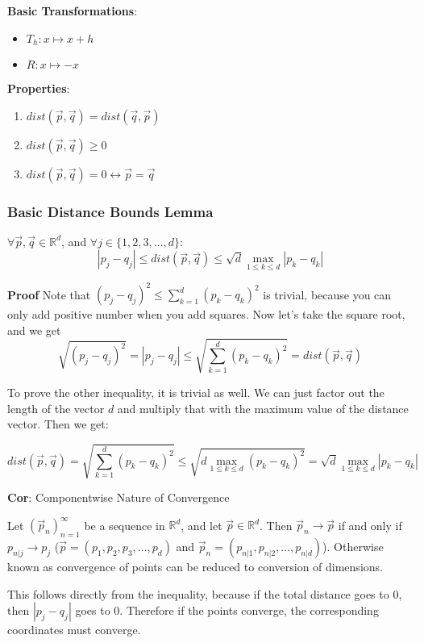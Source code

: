 \documentclass[11 pt, twoside]{article}
\begin{document}
\textbf{Basic Transformations}:
\begin{itemize}
    \item $T_h : x \mapsto x+h$
    \item $R: x \mapsto -x$
\end{itemize}

\textbf{Properties}:
\begin{enumerate}
    \item $dist(\vec{p}, \vec{q}) = dist(\vec{q}, \vec{p})$
    \item $dist(\vec{p}, \vec{q}) \geq 0$
    \item $dist(\vec{p}, \vec{q}) = 0 \leftrightarrow \vec{p} = \vec{q}$
\end{enumerate}

\subsubsection{Basic Distance Bounds Lemma}
 $\forall \vec{p}, \vec{q} \in
\mathbb{R}^d$, and $\forall j \in \{1,2,3,\dots,d\}$:
$$|p_j - q_j| \leq dist(\vec{p}, \vec{q}) \leq \sqrt{d} \max_{1 \leq k \leq
d} |p_k - q_k|$$

\textbf{Proof}
Note that $(p_j - q_j)^2 \leq \sum_{k = 1}^d (p_k - q_k)^2$ is trivial, because
you can only add positive number when you add squares. Now let's take the square
root, and we get
$$\sqrt{(p_j - q_j)^2} = |p_j - q_j| \leq \sqrt{\sum_{k = 1}^d (p_k - q_k)^2} =
dist(\vec{p}, \vec{q})$$

To prove the other inequality, it is trivial as well. We can just factor out the
length of the vector $d$ and multiply that with the maximum value of the
distance vector. Then we get:

$$dist(\vec{p}, \vec{q}) = \sqrt{\sum_{k = 1}^d (p_k - q_k)^2} \leq \sqrt{d \max_{1 \leq k \leq d} (p_k -
q_k)^2} = \sqrt{d} \max_{1 \leq k \leq
d} |p_k - q_k|$$

\textbf{Cor}: Componentwise Nature of Convergence

Let $(\vec{p}_n)_{n = 1}^\infty$ be a sequence in $\mathbb{R}^d$, and let
$\vec{p} \in \mathbb{R}^d$. Then $\vec{p}_n \to \vec{p}$ if and only if
$p_{n|j} \to p_j$ ($\vec{p} = (p_1, p_2, p_3, \dots, p_d)$ and $\vec{p}_n =
(p_{n|1}, p_{n|2}, \dots, p_{n|d})$). Otherwise known as convergence of points
can be reduced to conversion of dimensions.

This follows directly from the inequality, because if the total distance goes to
0, then $|p_j - q_j|$ goes to 0. Therefore if the points converge, the
corresponding coordinates must converge.
\end{document}
